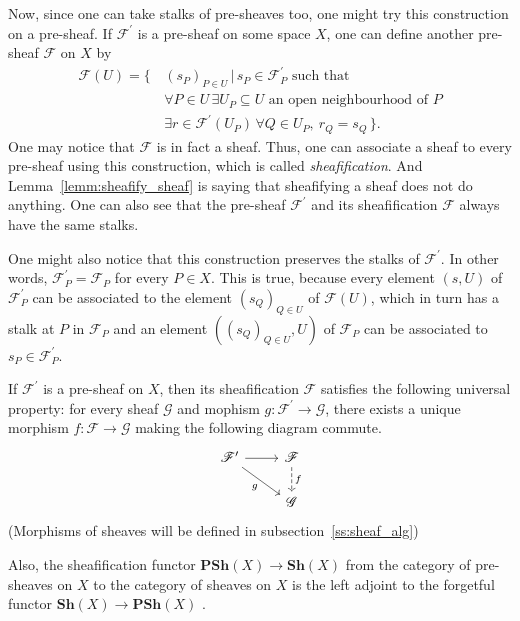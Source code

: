 Now, since one can take stalks of pre-sheaves too, one might try this
construction on a pre-sheaf. If $\mathscr{F}^{\prime}$ is a pre-sheaf
on some space $X$, one can define another pre-sheaf $\mathscr{F}$
on $X$ by
\begin{align*}
  \mathscr{F}(U)=\big\{\,
  & (s_{P})_{P\in U}\,\big\vert\, s_{P}\in\mathscr{F}_{P}^{\prime}
    \text{ such that} \\
  & \forall P\in U\,
    \exists U_{P}\subseteq U\text{ an open neighbourhood of }P \\
  & \exists r\in\mathscr{F}^{\prime}(U_{P})\,\forall Q\in U_{P},
    \ r_{Q}=s_{Q}\,\big\}.
\end{align*}
One may notice that $\mathscr{F}$ is in fact a sheaf. Thus, one can
associate a sheaf to every pre-sheaf using this construction, which is
called \emph{sheafification}. And Lemma~\ref{lemm:sheafify_sheaf} is saying
that sheafifying a sheaf does not do anything. One can also see that the
pre-sheaf $\mathscr{F}^{\prime}$ and its sheafification $\mathscr{F}$ always
have the same stalks.
\begin{rem}
  One might also notice that this construction preserves the stalks of
  $\mathscr{F}^{\prime}$. In other words, $\mathscr{F}^{\prime}_{P}
  =\mathscr{F}_{P}$ for every $P\in X$. This is true, because every
  element $(s, U)$ of $\mathscr{F}^{\prime}_{P}$ can be associated to
  the element $(s_{Q})_{Q\in U}$ of $\mathscr{F}(U)$, which in turn has
  a stalk at $P$ in $\mathscr{F}_{P}$ and an element $((s_{Q})_{Q\in U},
  U)$ of $\mathscr{F}_{P}$ can be associated to $s_{P}\in
  \mathscr{F}^{\prime}_{P}$.
\end{rem}
\begin{cat}
  If $\mathscr{F}^{\prime}$ is a pre-sheaf on $X$, then its sheafification
  $\mathscr{F}$ satisfies the following universal property: for every sheaf
  $\mathscr{G}$ and mophism $g:\mathscr{F}^{\prime}\to\mathscr{G}$, there
  exists a unique morphism $f:\mathscr{F}\to\mathscr{G}$ making the following
  diagram commute.
  \[\begin{tikzcd}
      \mathscr{F}^{\prime}\rar\arrow[dr, "g"'] & \mathscr{F}
      \arrow[d, dashed, "f"] \\ & \mathscr{G}
    \end{tikzcd}\]
  (Morphisms of sheaves will be defined in subsection~\ref{ss:sheaf_alg})

  Also, the sheafification functor $\mathbf{PSh}(X)\to\mathbf{Sh}(X)$
  from the category of pre-sheaves on $X$ to the category of sheaves on $X$
  is the left adjoint to the forgetful functor $\mathbf{Sh}(X)\to
  \mathbf{PSh}(X)$ \cite{vakil}.
\end{cat}
